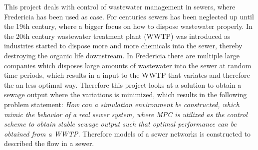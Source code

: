This project deals with control of wastewater management in sewers, where Fredericia has been used as case. For centuries sewers has been neglected up until the 19th century, where a bigger focus on how to dispose wastewater properly. In the 20th century wastewater treatment plant (WWTP) was introduced as industries started to dispose more and more chemicals into the sewer, thereby destroying the organic life downstream. In Fredericia there are multiple large companies which disposes large amounts of wastewater into the sewer at random time periods, which results in a input to the WWTP that variates and therefore the an less optimal way. Therefore this project looks at a solution to obtain a sewage output where the variations is minimized, which results in the following problem statement: \textit{How can a simulation environment be constructed, which mimic the behavior of a real sewer system, where MPC is utilized as the control scheme to obtain stable sewage output such that optimal performance can be obtained from a WWTP.} Therefore models of a sewer networks is constructed to described the flow in a sewer.           








